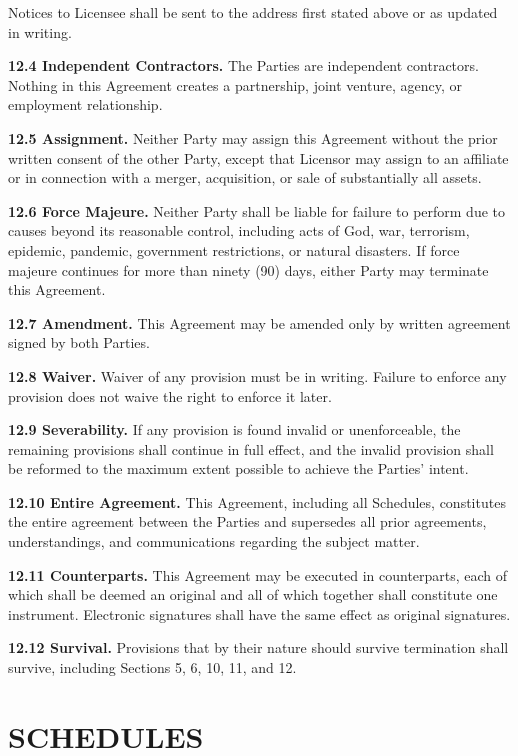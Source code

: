 \documentclass[11pt,a4paper]{article}
\begin{document}
Notices to Licensee shall be sent to the address first stated above or as updated in writing.

\textbf{12.4 Independent Contractors.} The Parties are independent contractors. Nothing in this Agreement creates a partnership, joint venture, agency, or employment relationship.

\textbf{12.5 Assignment.} Neither Party may assign this Agreement without the prior written consent of the other Party, except that Licensor may assign to an affiliate or in connection with a merger, acquisition, or sale of substantially all assets.

\textbf{12.6 Force Majeure.} Neither Party shall be liable for failure to perform due to causes beyond its reasonable control, including acts of God, war, terrorism, epidemic, pandemic, government restrictions, or natural disasters. If force majeure continues for more than ninety (90) days, either Party may terminate this Agreement.

\textbf{12.7 Amendment.} This Agreement may be amended only by written agreement signed by both Parties.

\textbf{12.8 Waiver.} Waiver of any provision must be in writing. Failure to enforce any provision does not waive the right to enforce it later.

\textbf{12.9 Severability.} If any provision is found invalid or unenforceable, the remaining provisions shall continue in full effect, and the invalid provision shall be reformed to the maximum extent possible to achieve the Parties' intent.

\textbf{12.10 Entire Agreement.} This Agreement, including all Schedules, constitutes the entire agreement between the Parties and supersedes all prior agreements, understandings, and communications regarding the subject matter.

\textbf{12.11 Counterparts.} This Agreement may be executed in counterparts, each of which shall be deemed an original and all of which together shall constitute one instrument. Electronic signatures shall have the same effect as original signatures.

\textbf{12.12 Survival.} Provisions that by their nature should survive termination shall survive, including Sections 5, 6, 10, 11, and 12.

\section{SCHEDULES}
\end{document}
